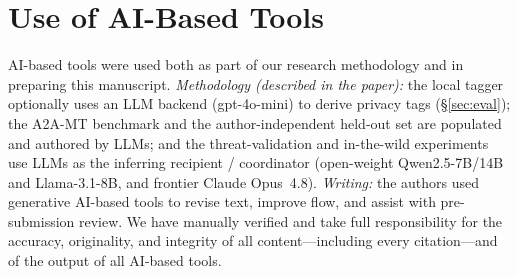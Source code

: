 \documentclass[conference,compsoc]{IEEEtran}
\begin{document}
\section*{Use of AI-Based Tools}
AI-based tools were used both as part of our research methodology and in preparing
this manuscript. \emph{Methodology (described in the paper):} the local tagger
optionally uses an LLM backend (gpt-4o-mini) to derive privacy tags
(\S\ref{sec:eval}); the A2A-MT benchmark and the author-independent held-out set are
populated and authored by LLMs; and the threat-validation and in-the-wild experiments
use LLMs as the inferring recipient / coordinator (open-weight Qwen2.5-7B/14B and
Llama-3.1-8B, and frontier Claude Opus~4.8). \emph{Writing:}
the authors used generative AI-based tools to revise text, improve flow, and assist
with pre-submission review. We have manually verified and take full responsibility
for the accuracy, originality, and integrity of all content---including every
citation---and of the output of all AI-based tools.

\appendix






\end{document}
